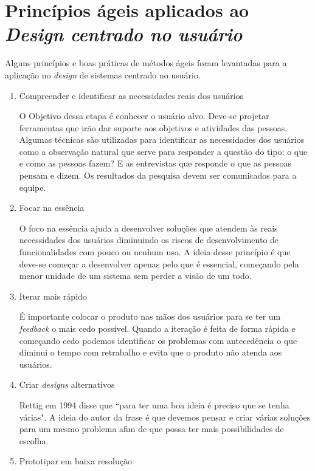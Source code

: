 \newpage

\section{Princípios ágeis aplicados ao \emph{Design centrado no usuário}}

	Alguns princípios e boas práticas de métodos ágeis foram levantadas para a aplicação no \emph{design} de sistemas centrado no usuário.

\begin{enumerate}

\item Compreender e identificar as necessidades reais dos usuários

O Objetivo dessa etapa é conhecer o usuário alvo. Deve-se projetar ferramentas que irão dar suporte aos objetivos e atividades das pessoas.
%
Algumas técnicas são utilizadas para identificar as necessidades dos usuários como a observação natural que serve para responder a questão do tipo: o que e como as pessoas fazem? E as entrevistas que responde o que as pessoas pensam e dizem. Os resultados da pesquisa devem ser comunicados para a equipe.

\item Focar na essência

O foco na essência ajuda a desenvolver soluções que atendem às reais necessidades dos usuários diminuindo os riscos de desenvolvimento de funcionalidades com pouco ou nenhum uso.
%
A ideia desse princípio é que deve-se começar a desenvolver apenas pelo que é essencial, começando pela menor unidade de um sistema sem perder a visão de um todo.

\item Iterar mais rápido

	É importante colocar o produto nas mãos dos usuários para se ter um \textit{feedback} o mais cedo possível. Quando a iteração é feita de forma rápida e começando cedo podemos identificar os problemas com antecedência o que diminui o tempo com retrabalho e evita que o produto não atenda aos usuários.
	

\item Criar \emph{designs} alternativos

	Rettig em 1994 disse que ``para ter uma boa ideia é preciso que se tenha várias". A ideia do autor da frase é que devemos pensar e criar várias soluções para um mesmo problema afim de que possa ter mais possibilidades de escolha. 


\item Prototipar em baixa resolução


\end{enumerate}
